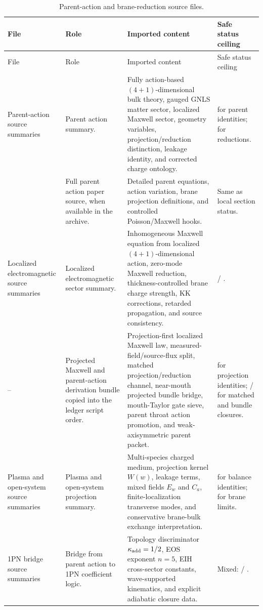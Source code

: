 \begin{longtable}{@{}L{0.28\textwidth}L{0.24\textwidth}L{0.32\textwidth}L{0.10\textwidth}@{}}
\caption{Parent-action and brane-reduction source files.}\label{tab:parent-action-source-files}\\
\toprule
File & Role & Imported content & Safe status ceiling \\
\midrule
\endfirsthead
\toprule
File & Role & Imported content & Safe status ceiling \\
\midrule
\endhead
Parent-action source summaries & Parent action summary. & Fully action-based \((4+1)\)-dimensional bulk theory, gauged GNLS matter sector, localized Maxwell sector, geometry variables, projection/reduction distinction, leakage identity, and corrected charge ontology. & \StatusExact{} for parent identities; \StatusReduced{} for reductions. \\
\addlinespace
{} & Full parent action paper source, when available in the archive. & Detailed parent equations, action variation, brane projection definitions, and controlled Poisson/Maxwell hooks. & Same as local section status. \\
\addlinespace
Localized electromagnetic source summaries & Localized electromagnetic sector summary. & Inhomogeneous Maxwell equation from localized \((4+1)\)-dimensional action, zero-mode Maxwell reduction, thickness-controlled brane charge strength, KK corrections, retarded propagation, and source consistency. & \StatusExact{} / \StatusReduced{}. \\
\addlinespace
{}-- & Projected Maxwell and parent-action derivation bundle copied into the ledger script order. & Projection-first localized Maxwell law, measured-field/source-flux split, matched projection/reduction channel, near-mouth projected bundle bridge, mouth-Taylor gate sieve, parent throat action promotion, and weak-axisymmetric parent packet. & \StatusExact{} for projection identities; \StatusReduced{} / \StatusExactClosure{} for matched and bundle closures. \\
\addlinespace
Plasma and open-system source summaries & Plasma and open-system projection summary. & Multi-species charged medium, projection kernel \(W(w)\), leakage terms, mixed fields \(E_w\) and \(C_a\), finite-localization transverse modes, and conservative brane-bulk exchange interpretation. & \StatusExact{} for balance identities; \StatusReduced{} for brane limits. \\
\addlinespace
1PN bridge source summaries & Bridge from parent action to 1PN coefficient logic. & Topology discriminator \(\kappa_{\rm add}=1/2\), EOS exponent \(n=5\), EIH cross-sector constants, wave-supported kinematics, and explicit adiabatic closure data. & Mixed: \StatusReduced{} / \StatusExactClosure{}. \\
\bottomrule
\end{longtable}

